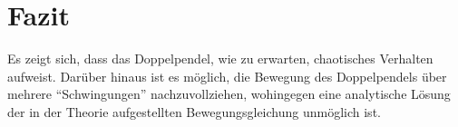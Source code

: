 \section{Fazit}
Es zeigt sich, dass das Doppelpendel, wie zu erwarten, chaotisches Verhalten aufweist. Darüber hinaus ist es möglich, die Bewegung des Doppelpendels über mehrere \enquote{Schwingungen} nachzuvollziehen, wohingegen eine analytische Lösung der in der Theorie aufgestellten Bewegungsgleichung unmöglich ist. 